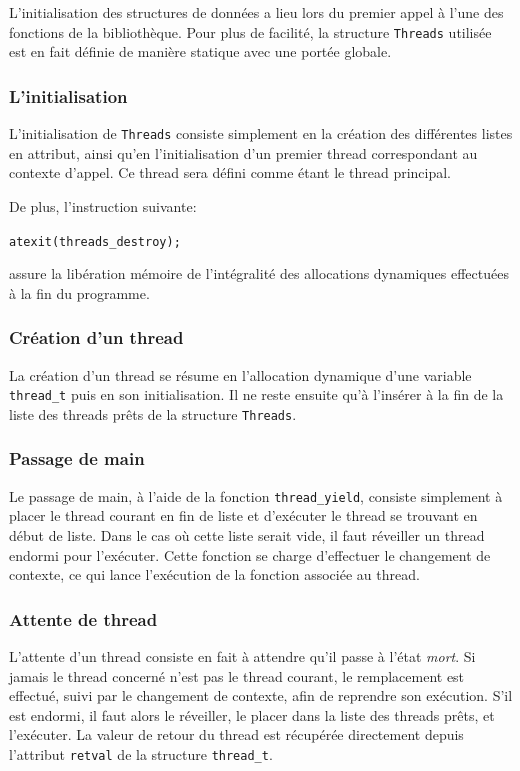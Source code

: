\documentclass[a4paper,11pt]{article}
\begin{document}
L'initialisation des structures de données a lieu lors du premier appel à l'une des fonctions de la bibliothèque. Pour plus de facilité, la structure \texttt{Threads} utilisée est en fait définie de manière statique avec une portée globale.

\subsubsection*{L'initialisation}

L'initialisation de \texttt{Threads} consiste simplement en la création des différentes listes en attribut, ainsi qu'en l'initialisation d'un premier thread correspondant au contexte d'appel. Ce thread sera défini comme étant le thread principal.

De plus, l'instruction suivante:
\begin{center}
\verb[atexit(threads_destroy);[
\end{center}
assure la libération mémoire de l'intégralité des allocations dynamiques effectuées à la fin du programme.

\subsubsection*{Création d'un thread}

La création d'un thread se résume en l'allocation dynamique d'une variable \texttt{thread\_t} puis en son initialisation. Il ne reste ensuite qu'à l'insérer à la fin de la liste des threads prêts de la structure \texttt{Threads}.

\subsubsection*{Passage de main}

Le passage de main, à l'aide de la fonction \texttt{thread\_yield}, consiste simplement à placer le thread courant en fin de liste et d'exécuter le thread se trouvant en début de liste. Dans le cas où cette liste serait vide, il faut réveiller un thread endormi pour l'exécuter. Cette fonction se charge d'effectuer le changement de contexte, ce qui lance l'exécution de la fonction associée au thread.

\subsubsection*{Attente de thread}

L'attente d'un thread consiste en fait à attendre qu'il passe à l'état \textit{mort}. Si jamais le thread concerné n'est pas le thread courant, le remplacement est effectué, suivi par le changement de contexte, afin de reprendre son exécution. S'il est endormi, il faut alors le réveiller, le placer dans la liste des threads prêts, et l'exécuter. La valeur de retour du thread est récupérée directement depuis l'attribut \texttt{retval} de la structure \texttt{thread\_t}.
\end{document}

